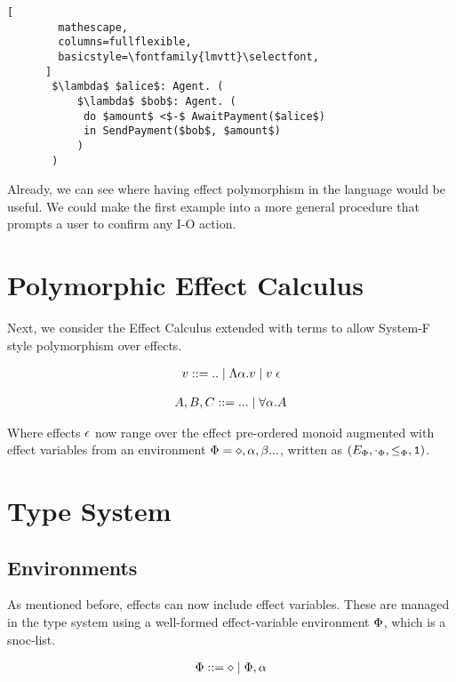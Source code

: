 \documentclass{Report}
\begin{document}
\begin{framed}
    \begin{lstlisting}[
        mathescape,
        columns=fullflexible,
        basicstyle=\fontfamily{lmvtt}\selectfont,
      ]
       $\lambda$ $alice$: Agent. (
           $\lambda$ $bob$: Agent. (
            do $amount$ <$-$ AwaitPayment($alice$)
            in SendPayment($bob$, $amount$)
           )
       )
      \end{lstlisting}
\end{framed}

Already, we can see where having effect polymorphism in the language would be useful. We could make the first example  into a more general procedure that prompts a user to confirm any I-O action.

\section{Polymorphic Effect Calculus}
Next, we consider the Effect Calculus extended with terms to allow System-F style polymorphism over effects.


\begin{align}
    v::=\text{..}\mid\elam{\a}{v}\mid\eapp{v}{\e}
\end{align}

\begin{align}
    A, B, C::=\text{...}\mid \all{\a}{A}
\end{align}

Where effects $\e$ now range over the effect pre-ordered monoid augmented with effect variables from an environment  $\P = \nil, \a, \b ...$, written as $(E_\P, \dotp, \subeffectp, \1)$.

\section{Type System}
\subsection{Environments}
As mentioned before, effects can now include effect variables. These are managed in the type system using a well-formed effect-variable environment $\P$, which is a snoc-list.

\begin{align}
    \P ::= \nil \mid \P, \a
\end{align}
\end{document}

